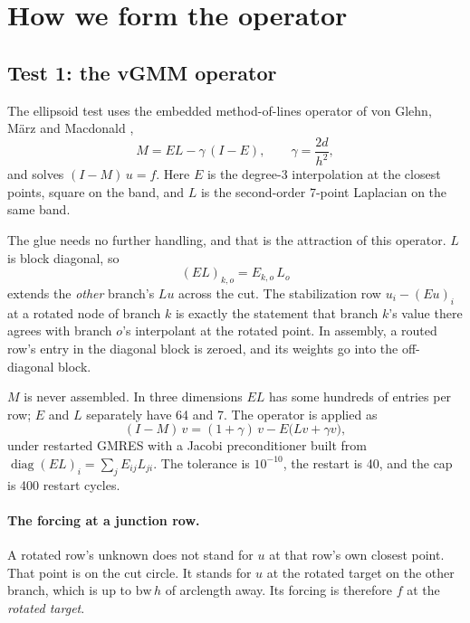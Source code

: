\section{How we form the operator}

\subsection{Test 1: the vGMM operator}

The ellipsoid test uses the embedded method-of-lines operator of von
Glehn, M\"arz and Macdonald \cite{vGMM2013},
\begin{equation}
  M = EL - \gamma\,(I-E), \qquad \gamma = \frac{2d}{h^2},
  \label{eq:vgmm}
\end{equation}
and solves $(I-M)\,u = f$. Here $E$ is the degree-3 interpolation at the
closest points, square on the band, and $L$ is the second-order 7-point
Laplacian on the same band.

The glue needs no further handling, and that is the attraction of this
operator. $L$ is block diagonal, so
\begin{equation}
  (EL)_{k,o} = E_{k,o}\,L_o
\end{equation}
extends the \emph{other} branch's $Lu$ across the cut. The stabilization
row $u_i - (Eu)_i$ at a rotated node of branch $k$ is exactly the
statement that branch $k$'s value there agrees with branch $o$'s
interpolant at the rotated point. In assembly, a routed row's entry in
the diagonal block is zeroed, and its weights go into the off-diagonal
block.

$M$ is never assembled. In three dimensions $EL$ has some hundreds of
entries per row; $E$ and $L$ separately have 64 and 7. The operator is
applied as
\begin{equation}
  (I-M)\,v = (1+\gamma)\,v - E\bigl(Lv + \gamma v\bigr) ,
\end{equation}
under restarted GMRES with a Jacobi preconditioner built from
$\operatorname{diag}(EL)_i = \sum_j E_{ij}L_{ji}$. The tolerance is
$10^{-10}$, the restart is 40, and the cap is 400 restart cycles.

\paragraph{The forcing at a junction row.} A rotated row's unknown does
not stand for $u$ at that row's own closest point. That point is on the
cut circle. It stands for $u$ at the rotated target on the other branch,
which is up to $\mathrm{bw}\,h$ of arclength away. Its forcing is
therefore $f$ at the \emph{rotated target}.

